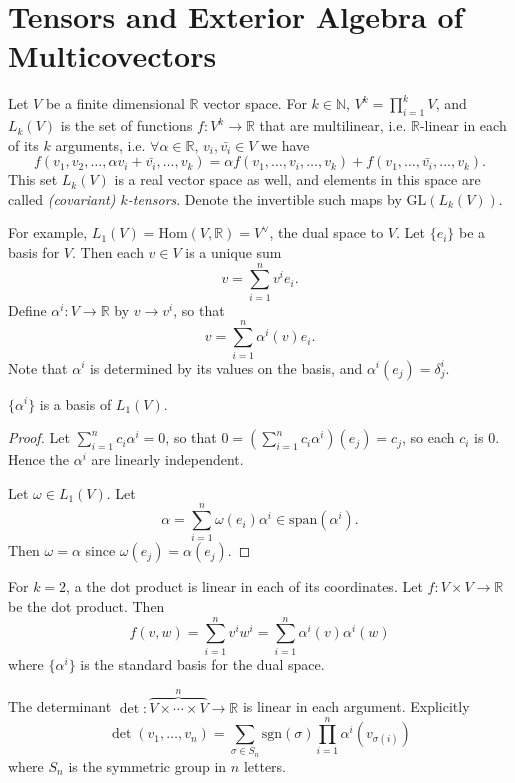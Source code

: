 \section{Tensors and Exterior Algebra of Multicovectors}

Let $V$ be a finite dimensional $\mathbb{R}$ vector space.
For $k \in \mathbb{N}$,
$V^k = \prod_{i=1}^k V$, and
$L_k(V)$ is the set of functions $f: V^k \to \mathbb{R}$ that are
multilinear, i.e. $\mathbb{R}$-linear in each of its $k$ arguments,
i.e. $\forall \alpha \in \mathbb{R}$, $v_i, \bar{v_i} \in V$ we have
$$
  f(v_1, v_2, \dots, \alpha v_i + \bar{v_i}, \dots, v_k)
= \alpha f(v_1, \dots, v_i, \dots, v_k)
+ f(v_1, \dots, \bar{v_i}, \dots, v_k).
$$
This set $L_k(V)$ is a real vector space as well, and elements in this
space are called \emph{(covariant) $k$-tensors}. Denote the invertible
such maps by $\mathrm{GL}(L_k(V))$.

For example, $L_1(V) = \mathrm{Hom}(V, \mathbb{R}) = V^\vee$, the dual
space to $V$. Let $\{ e_i \}$ be a basis for $V$. Then each $v \in V$
is a unique sum
$$
  v
= \sum_{i=1}^n v^i e_i.
$$
Define $\alpha^i : V \to \mathbb{R}$ by $v \to v^i$, so that
$$
  v
= \sum_{i=1}^n \alpha^i(v) e_i.
$$
Note that $\alpha^i$ is determined by its values on the basis,
and $\alpha^i(e_j) = \delta_j^i$.

\begin{lemma}
$\{ \alpha^i \}$ is a basis of $L_1(V)$.
\end{lemma}

\begin{proof}
Let $\sum_{i=1}^n c_i \alpha^i = 0$, so that
$0 = \left(\sum_{i=1}^n c_i \alpha^i\right)(e_j) = c_j$,
so each $c_i$ is 0. Hence the $\alpha^i$ are linearly independent.

Let $\omega \in L_1(V)$. Let
$$
  \alpha
= \sum_{i=1}^n \omega(e_i) \alpha^i
\in \mathrm{span}(\alpha^i).
$$
Then $\omega = \alpha$ since $\omega(e_j) = \alpha(e_j)$.
\end{proof}

\begin{xmpl}
For $k = 2$, a the dot product is linear in each of its coordinates.
Let $f : V \times V \to \mathbb{R}$ be the dot product. Then
$$
  f(v, w)
= \sum_{i=1}^n v^i w^i
= \sum_{i=1}^n \alpha^i(v) \alpha^i(w)
$$
where $\{ \alpha^i \}$ is the standard basis for the dual space.
\end{xmpl}

\begin{xmpl}
The determinant $\det : \overbrace{V \times \cdots \times V}^n \to \mathbb{R}$ is linear
in each argument. Explicitly
$$
  \det (v_1, \dots, v_n)
= \sum_{\sigma \in S_n}
    \mathrm{sgn}(\sigma)
    \prod_{i=1}^n
      \alpha^i(v_{\sigma(i)})
$$
where $S_n$ is the symmetric group in $n$ letters.
\end{xmpl}

